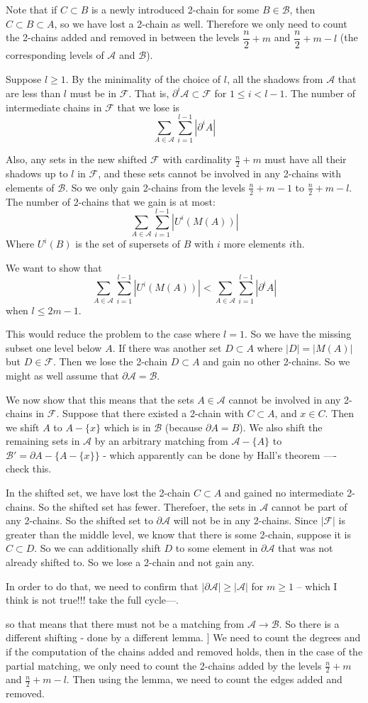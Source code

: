 \documentclass[11pt]{article}
\newcommand{\F}{\mathcal{F}}
\newcommand{\A}{\mathcal{A}}
\newcommand{\B}{\mathcal{B}}
\begin{document}
Note that if $C \subset B$ is a newly introduced 2-chain for some $B \in \B$, then $C \subset B \subset A$, so we have lost a 2-chain as well. Therefore we only need to count the 2-chains added and removed in between the levels $\dfrac{n}{2} + m$ and $\dfrac{n}{2} + m - l$ (the corresponding levels of $\A$ and $\B$). 

Suppose $l \geq 1$. By the minimality of the choice of $l$, all the shadows from $\A$ that are less than $l$ must be in $\F$. That is, $\partial^i\A \subset \F$ for $1 \leq i < l-1$. The number of intermediate chains in $\F$ that we lose is
\[ \sum_{A \in \A} \sum_{i=1}^{l-1} |\partial^i A| \]

Also, any sets in the new shifted $\F$ with cardinality $\frac{n}{2} + m$ must have all their shadows up to $l$ in $\F$, and these sets cannot be involved in any 2-chains with elements of $\B$. So we only gain 2-chains from the levels $\frac{n}{2}+m-1$ to $\frac{n}{2}+m-l$. The number of 2-chains that we gain is at most:
\[ \sum_{A \in \A} \sum_{i=1}^{l-1} |U^i(M(A))| \]
Where $U^i(B)$ is the set of supersets of $B$ with $i$ more elements $i$th.

We want to show that \[ \sum_{A \in \A} \sum_{i=1}^{l-1} |U^i(M(A))| <  \sum_{A \in \A} \sum_{i=1}^{l-1} |\partial^i A| \] when $l \leq 2m-1$.

This would reduce the problem to the case where $l=1$. So we have the missing subset one level below $A$. If there was another set $D \subset A$ where $|D| = |M(A)|$ but $D \in \F$. Then we lose the 2-chain $D \subset A$ and gain no other 2-chains. So we might as well assume that $\partial \A = \B$. 

We now show that this means that the sets $A \in \A$ cannot be involved in any 2-chains in $\F$. Suppose that there existed a 2-chain with $C \subset A$, and $x \in C$. Then we shift $A$ to $A - \{ x \}$ which is in $\B$ (because $\partial A = B$). We also shift the remaining sets in $\A$ by an arbitrary matching from $\A - \{ A \}$ to $\B' = \partial A - \{ A - \{x\} \}$ - which apparently can be done by Hall's theorem ---- check this. 

In the shifted set, we have lost the 2-chain $C \subset A$ and gained no intermediate 2-chains. So the shifted set has fewer. Therefoer, the sets in $\A$ cannot be part of any 2-chains. So the shifted set to $\partial \A$ will not be in any 2-chains. Since $|\F|$ is greater than the middle level, we know that there is some 2-chain, suppose it is $C \subset D$. So we can additionally shift $D$ to some element in $\partial \A$ that was not already shifted to. So we lose a 2-chain and not gain any. 

In order to do that, we need to confirm that $|\partial \A| \geq |\A|$ for $m\geq 1$ -- which I think is not true!!! take the full cycle---. 

so that means that there must not be a matching from $\A \rightarrow \B$. So there is a different shifting - done by a different lemma. ]
We need to count the degrees and if the computation of the chains added and removed holds, then in the case of the partial matching, we only need to count the 2-chains added by the levels $\frac{n}{2}+m$ and $\frac{n}{2} + m - l$. Then using the lemma, we need to count the edges added and removed. 
\end{document}
